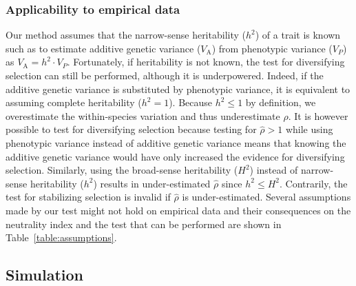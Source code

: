\documentclass{article}
\newcommand{\Multiply}{\cdot}
\newcommand{\Trait}{P}
\newcommand{\Heritability}{h^2}
\newcommand{\VarPhenotype}{V_{\Trait}}
\newcommand{\VarGenetic}{V_{\mathrm{A}}}
\newcommand{\EstNI}{\widehat{\rho}}
\begin{document}
\subsubsection*{Applicability to empirical data}

Our method assumes that the narrow-sense heritability ($\Heritability$) of a trait is known such as to estimate additive genetic variance ($\VarGenetic$) from phenotypic variance ($\VarPhenotype$) as $\VarGenetic = \Heritability \Multiply \VarPhenotype$.
Fortunately, if heritability is not known, the test for diversifying selection can still be performed, although it is underpowered.
Indeed, if the additive genetic variance is substituted by phenotypic variance, it is equivalent to assuming complete heritability ($\Heritability = 1$).
Because $\Heritability \leq 1$ by definition, we overestimate the within-species variation and thus underestimate $\EstNI$.
It is however possible to test for diversifying selection because testing for $\EstNI > 1$ while using phenotypic variance instead of additive genetic variance means that knowing the additive genetic variance would have only increased the evidence for diversifying selection.
Similarly, using the broad-sense heritability ($H^2$) instead of narrow-sense heritability ($\Heritability$) results in under-estimated $\EstNI$ since $\Heritability \leq H^2$.
Contrarily, the test for stabilizing selection is invalid if $\EstNI$ is under-estimated.
Several assumptions made by our test might not hold on empirical data and their consequences on the neutrality index and the test that can be performed are shown in Table~\ref{table:assumptions}.


\subsection*{Simulation}\label{subsec:simulations}
\end{document}
